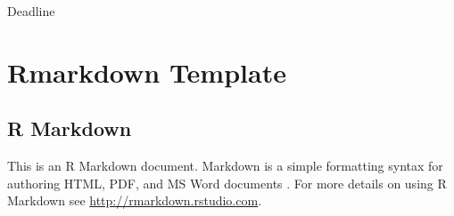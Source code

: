 \begin{titlepage}
  \noindent\begin{minipage}[t]{0.5\textwidth}
  \end{minipage}
  \begin{minipage}[t]{0.7\textwidth}
    \hspace{1cm}Deadline                %
  \end{minipage}

\end{titlepage}

\restoregeometry



\begin{abstract}
The abstract is written directly in the YAML header.
\end{abstract}

{
  \hypersetup{linkcolor=black}
  \setcounter{tocdepth}{3}
  \tableofcontents
}

\newpage
\printnoidxglossary[type=acronym, style=superheader, title=Acronyms]

\newpage
\listoftables
\newpage
\listoffigures



\newpage
{}

\section{Rmarkdown Template}\label{rmarkdown-template}

\subsection{R Markdown}\label{r-markdown}

This is an R Markdown document. Markdown is a simple formatting syntax
for authoring HTML, PDF, and MS Word documents . For more details on
using R Markdown see \url{http://rmarkdown.rstudio.com}.

